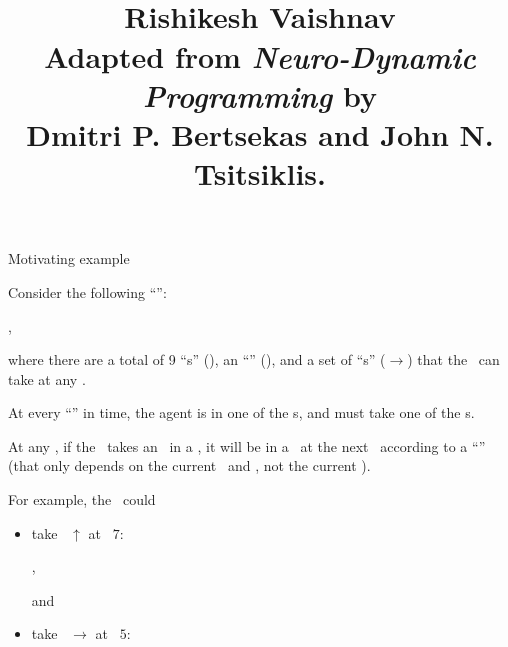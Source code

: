 \documentclass{rl_theory}
\begin{document}
\title{
\\
\vspace{10pt}
\large 
Rishikesh Vaishnav\\ 
\vspace{10pt}
\normalsize 
Adapted from
{\it Neuro-Dynamic Programming}
by \\
Dmitri P. Bertsekas
and
John N. Tsitsiklis.
}
\maketitle

\begin{part} {Motivating example}
  

  Consider the following ``\brd'':\\
  \begin{center}
    ,
  \end{center}
  where there are a total of 9 ``\til{}s'' (), 
  an ``\agt'' (), and
  a set of ``\act{}s'' ($\rightarrow$) that the \agt\ can take at any \til.

  At every ``\stp'' in time, the agent is in one of the \til{}s,
  and must take one of the \act{}s. 

  At any \stp, if the \agt\ takes an \act\ in a \til, 
  it will be in a \til\ at the next \stp\ according to a ``\trd''
  (that only depends on the current \til\ and \act, not the current \stp).

  For example, the \agt\ could
  \begin{itemize}
    \def\tilesep{3.2}
    \def\tscale{0.6}
    \item take \act\ $\uparrow$ at \til\ $7$:
      \begin{center}
        ,
      \end{center}
      and
    \item take \act\ $\rightarrow$ at \til\ $5$:
      \begin{center}
\end{center}
\end{itemize}
\end{part}
\end{document}
